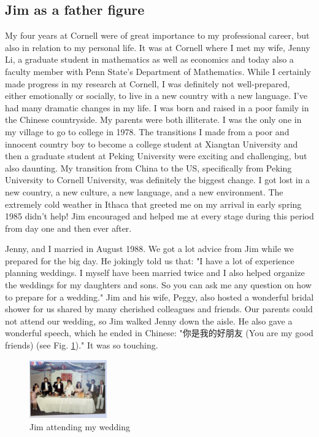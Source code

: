 \documentclass[CJK,11pt]{amsart}
\theoremstyle{definition}
\begin{document}
\begin{CJK*}{UTF8}{gbsn}
\section{Jim as a father figure}
My four years at Cornell were of great importance to my professional career, but also in relation to my personal life. It was at Cornell where I met my wife, Jenny Li, a graduate student in mathematics as well as economics and today also a faculty member with Penn State's Department of Mathematics.
While I certainly made progress in my research at Cornell, I was definitely not well-prepared, either emotionally or socially, to live in a new country with a new language. I've had many dramatic changes in my life. I was born and raised in a poor family in the Chinese countryside. My parents were both illiterate. I was the only one in my village to go to college in 1978. The transitions I made from a poor and innocent country boy to become a college student at Xiangtan University and then a graduate student at Peking University were exciting and challenging, but also daunting. My transition from China to the US, specifically from Peking University to Cornell University, was definitely the biggest change. I got lost in a new country, a new culture, a new language, and a new environment. The extremely cold weather in Ithaca that greeted me on my arrival in early spring 1985 didn't help! Jim encouraged and helped me at every stage during this period from day one and then ever after. 

Jenny, and I married in August 1988. We got a lot advice from Jim while we prepared for the big day. He jokingly told us that: "I have a lot of experience planning weddings. I myself have been married twice and I also helped organize the weddings for my daughters and sons. So you can ask me any question on how to prepare for a wedding."
Jim and his wife, Peggy, also hosted a wonderful bridal shower for us shared by many cherished colleagues and friends. Our parents could not attend our wedding, so Jim walked Jenny down the aisle. He also gave a wonderful speech, which he ended in Chinese: "你是我的好朋友 (You are my good friends) (see Fig. \ref{FigW})."  It was so touching.
\begin{figure}[h]
 \includegraphics[height=2.5cm]{Jim@Wedding.jpeg}
 \caption{\tiny Jim attending my wedding}
 \label{FigW}
\end{figure}


\end{CJK*}
\end{document}
